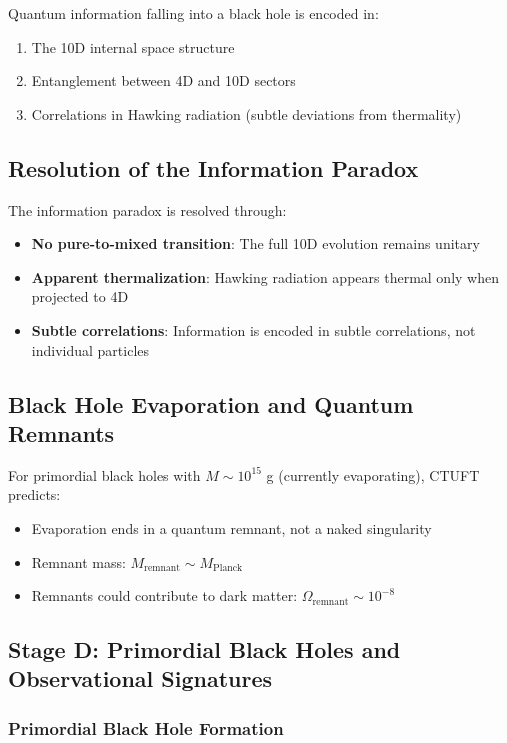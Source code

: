 Quantum information falling into a black hole is encoded in:
\begin{enumerate}
    \item The 10D internal space structure
    \item Entanglement between 4D and 10D sectors
    \item Correlations in Hawking radiation (subtle deviations from thermality)
\end{enumerate}

\subsection{Resolution of the Information Paradox}

The information paradox is resolved through:
\begin{itemize}
    \item \textbf{No pure-to-mixed transition}: The full 10D evolution remains unitary
    \item \textbf{Apparent thermalization}: Hawking radiation appears thermal only when projected to 4D
    \item \textbf{Subtle correlations}: Information is encoded in subtle correlations, not individual particles
\end{itemize}

\subsection{Black Hole Evaporation and Quantum Remnants}

For primordial black holes with $M \sim 10^{15}$ g (currently evaporating), CTUFT predicts:
\begin{itemize}
    \item Evaporation ends in a quantum remnant, not a naked singularity
    \item Remnant mass: $M_{\text{remnant}} \sim M_{\text{Planck}}$
    \item Remnants could contribute to dark matter: $\Omega_{\text{remnant}} \sim 10^{-8}$
\end{itemize}

\subsection{Stage D: Primordial Black Holes and Observational Signatures}
\label{subsec:stageD_primordial}

\subsubsection{Primordial Black Hole Formation}

